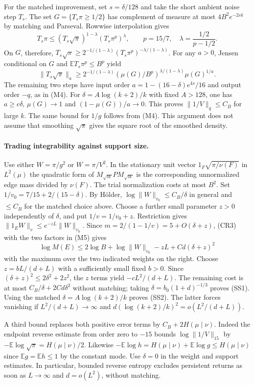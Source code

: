 For the matched improvement, set $s=\delta/128$ and take the short ambient
noise step $T_s$. The set $G=\{T_s\pi\ge1/2\}$ has complement of measure at
most $4B^2e^{-2sk}$ by matching and Parseval. Rowwise interpolation gives
\[
 T_s\pi\le(T_s\sqrt\pi)^{1-\lambda}(T_s\pi^p)^\lambda,\qquad
 p=15/7,\quad \lambda=\frac{1/2}{p-1/2}.
\]
On $G$, therefore, $T_s\sqrt\pi\ge 2^{-1/(1-\lambda)}
(T_s\pi^p)^{-\lambda/(1-\lambda)}$. For any $a>0$, Jensen conditional
on $G$ and $\mathbb E T_s\pi^p\le B^p$ yield
\[
 \|T_s\sqrt\pi\|_a\ge
 2^{-1/(1-\lambda)}
 (\mu(G)/B^p)^{\lambda/(1-\lambda)}\mu(G)^{1/a}.
\]
The remaining two steps have input order $a=1-(16-\delta)e^{4s}/16$
and output order $-q$, as in (M4). For $\delta=A\log(k+2)/k$ with fixed
$A>128$, one has $a\ge c\delta$, $\mu(G)\to1$ and
$(1-\mu(G))/a\to0$. This proves $\|1/V\|_q\le C_B$ for large $k$.
The same bound for $1/g$ follows from (M4). This argument does not assume
that smoothing $\sqrt\pi$ gives the square root of the smoothed density.

\paragraph{Trading integrability against support size.}
Use either $W=\pi/g^2$ or $W=\pi/V^2$. In the stationary unit vector
$1_F\sqrt{\pi/\nu(F)}$ in $L^2(\mu)$ the quadratic form of
$M_{\sqrt W}P M_{\sqrt W}$ is the corresponding unnormalized edge mass
divided by $\nu(F)$. The trial normalization costs at most $B^2$.
Set $1/v_0=7/15+2/(15-\delta)$. By H\"older,
$\log\|W\|_{v_0}\le C_B/\delta$ in general and $\le C_B$ for the matched
choice above. Choose a further small parameter $z>0$ independently of
$\delta$, and put $1/v=1/v_0+z$. Restriction gives
$\|1_EW\|_v\le e^{-zL}\|W\|_{v_0}$. Since $m=2/(1-1/v)=5+O(\delta+z)$,
(CR3) with the two factors in (M5) gives
\[
 \log M(E)\le 2\log B+\log\|W\|_{v_0}
                    -zL+Cd(\delta+z)^2                       \tag{SS3}
\]
with the maximum over the two indicated weights on the right. Choose $z=bL/(d+L)$ with a sufficiently small fixed $b>0$. Since
$(\delta+z)^2\le2\delta^2+2z^2$, the $z$ terms yield
$-c L^2/(d+L)$. The remaining cost is at most $C_B/\delta+2Cd\delta^2$
without matching; taking $\delta=b_0(1+d)^{-1/3}$ proves (SS1).
Using the matched $\delta=A\log(k+2)/k$ proves (SS2). The latter
forces vanishing if $L^2/(d+L)\to\infty$ and
$d(\log(k+2)/k)^2=o(L^2/(d+L))$.

A third bound replaces both positive error terms by
$C_B+2H(\mu\mid\nu)$. Indeed the endpoint reverse estimate from order
zero to $-15$ bounds $\log\|1/V\|_{15}$ by
$-\mathbb E\log\sqrt\pi=H(\mu\mid\nu)/2$. Likewise
$-\mathbb E\log h=H(\mu\mid\nu)+\mathbb E\log g\le H(\mu\mid\nu)$
since $\mathbb E g=\mathbb E h\le1$ by the constant mode.
Use $\delta=0$ in the weight and support estimates. In particular, bounded
reverse entropy excludes persistent returns as soon as $L\to\infty$
and $d=o(L^2)$, without matching.

